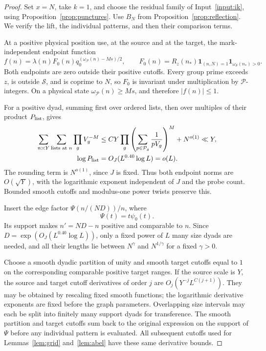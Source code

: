 \documentclass[11pt]{article}
\theoremstyle{definition}
\newcommand{\ind}{\mathbf 1}
\newcommand{\Pset}{\mathcal P}
\newcommand{\Sset}{\mathcal S}
\newcommand{\Rz}{R_z}
\theoremstyle{remark}
\begin{document}
\begin{proof}
Set $x=N$, take $k=1$, and choose the residual family of
Input~\ref{input:ik}, using Proposition~\ref{prop:punctures}.
Use $B_N$ from Proposition~\ref{prop:reflection}.
We verify the lift, the individual patterns, and then their comparison
terms.

At a positive physical position use, at the source and at the target,
the mark-independent endpoint function
\begin{equation}\label{eq:physical-endpoint}
f(n)=\lambda(n)F_0(n)q_0^{(\omega_{\Pset}(n)-Ms)/2},
\qquad
F_0(n)=\Rz(n_*)\ind_{(n,N)=1}
                         \ind_{\omega_{\Sset}(n_*)>0}.
\end{equation}
Both endpoints are zero outside their positive cutoffs.
Every group prime exceeds $z$, is outside $\Sset$, and is coprime
to $N$, so $F_0$ is invariant under multiplication by
$\Pset$-integers. On a physical state $\omega_{\Pset}(n)\ge Ms$,
and therefore $|f(n)|\le1$.

For a positive dyad, summing first over ordered lists, then over
multiples of their product $P_{\rm list}$, gives
\begin{equation}\label{eq:physical-norm}
\begin{split}
\sum_{n\asymp Y}\sum_{\text{lists at }n}\prod_gV_g^{-M}
&\le CY\prod_g
  \left(\sum_{p\in\Pset_g}\frac1{pV_g}\right)^M+N^{o(1)}
\ll Y,\\
\log P_{\rm list}&=O_J(L^{0.40}\log L)=o(L).
\end{split}
\end{equation}
The rounding term is $N^{o(1)}$, since $J$ is fixed.
Thus both endpoint norms are $O(\sqrt Y)$, with the logarithmic
exponent independent of $J$ and the probe count.
Bounded smooth cutoffs and modulus-one power twists preserve this.

Insert the edge factor $\Psi(n/(ND))/n$, where
\begin{equation}\label{eq:lift-cutoff}
\Psi(t)=t\psi_0(t).
\end{equation}
Its support makes $n'=ND-n$ positive and comparable to $n$.
Since $D=\exp(O_J(L^{0.40}\log L))$, only a fixed power of $L$
many size dyads are needed, and all their lengths lie between
$N^\gamma$ and $N^{1/\gamma}$ for a fixed $\gamma>0$.

Choose a smooth dyadic partition of unity and smooth target cutoffs
equal to $1$ on the corresponding comparable positive target ranges.
If the source scale is $Y$, the source and target cutoff derivatives
of order $j$ are $O_j(Y^{-j}L^{C(j+1)})$.
They may be obtained by rescaling fixed smooth functions; the
logarithmic derivative exponents are fixed before the graph parameters.
Overlapping size intervals may each be split into finitely many
support dyads for transference. The smooth partition and target
cutoffs sum back to the original expression on the support of $\Psi$
before any individual pattern is evaluated. All subsequent cutoffs
used for Lemmas~\ref{lem:grid} and~\ref{lem:abel} have these same
derivative bounds.


\end{proof}
\end{document}

